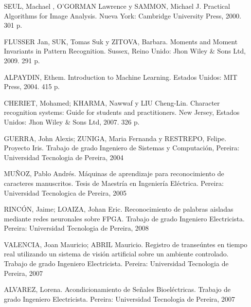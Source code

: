 \documentclass[a4paper, 12pt, oneside]{article}
\begin{document}
	SEUL, Machael , O'GORMAN Lawrence y SAMMON, Michael J. Practical Algorithms for Image Analysis. Nueva York: Cambridge University Press, 2000. 301 p.
	
	FLUSSER Jan, SUK, Tomas Suk y ZITOVA, Barbara. Moments and Moment Invariants in Pattern Recognition. Sussex, Reino Unido: Jhon Wiley \& Sons Ltd, 2009. 291 p.
	
	ALPAYDIN, Ethem. Introduction to Machine Learning. Estados Unidos: MIT Press, 2004. 415 p.
	
	CHERIET, Mohamed; KHARMA, Nawwaf y LIU Cheng-Lin. Character recognition systems: Guide for students and practitioners. New Jersey, Estados Unidos: Jhon Wiley \& Sons Ltd, 2007. 326 p.
	
	GUERRA, John Alexis; ZUNIGA, Maria Fernanda y RESTREPO, Felipe. Proyecto Iris. Trabajo de grado Ingeniero de Sistemas y Computación, Pereira: Universidad Tecnologia de Pereira, 2004
	
	MUÑOZ, Pablo Andrés. Máquinas de aprendizaje para reconocimiento de caracteres manuscritos. Tesis de Maestría en Ingeniería Eléctrica. Pereira: Universidad Tecnologica de Pereira, 2005
	
	RINCÓN, Jaime; LOAIZA, Johan Eric. Reconocimiento de palabras aisladas mediante redes neuronales sobre FPGA. Trabajo de grado Ingeniero Electricista. Pereira: Universidad Tecnologia de Pereira, 2008
	
	VALENCIA, Joan Mauricio; ABRIL Mauricio. Registro de transeúntes en tiempo real utilizando un sistema de visión artificial sobre un ambiente controlado. Trabajo de grado Ingeniero Electricista. Pereira: Universidad Tecnologia de Pereira, 2007
	
	ALVAREZ, Lorena. Acondicionamiento de Señales Bioeléctricas. Trabajo de grado Ingeniero Electricista. Pereira: Universidad Tecnologia de Pereira, 2007
	
	\clearpage
\end{document}
